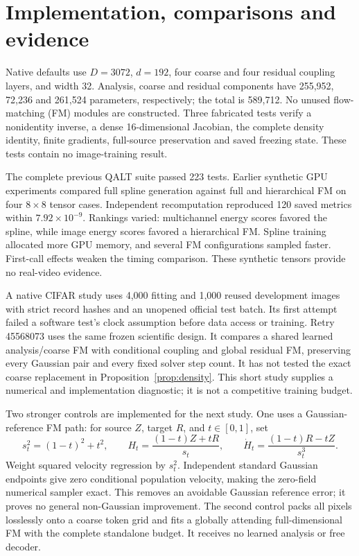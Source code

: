 \documentclass[11pt]{article}
\begin{document}
\section{Implementation, comparisons and evidence}
Native defaults use $D=3072$, $d=192$, four coarse and four residual coupling layers, and width 32. Analysis, coarse and residual components have 255,952, 72,236 and 261,524 parameters, respectively; the total is 589,712. No unused flow-matching (FM) modules are constructed. Three fabricated tests verify a nonidentity inverse, a dense 16-dimensional Jacobian, the complete density identity, finite gradients, full-source preservation and saved freezing state. These tests contain no image-training result.

The complete previous QALT suite passed 223 tests. Earlier synthetic GPU experiments compared full spline generation against full and hierarchical FM on four $8\times8$ tensor cases. Independent recomputation reproduced 120 saved metrics within $7.92\times10^{-9}$. Rankings varied: multichannel energy scores favored the spline, while image energy scores favored a hierarchical FM. Spline training allocated more GPU memory, and several FM configurations sampled faster. First-call effects weaken the timing comparison. These synthetic tensors provide no real-video evidence.

A native CIFAR study uses 4,000 fitting and 1,000 reused development images with strict record hashes and an unopened official test batch. Its first attempt failed a software test's clock assumption before data access or training. Retry 45568073 uses the same frozen scientific design. It compares a shared learned analysis/coarse FM with conditional coupling and global residual FM, preserving every Gaussian pair and every fixed solver step count. It has not tested the exact coarse replacement in Proposition~\ref{prop:density}. This short study supplies a numerical and implementation diagnostic; it is not a competitive training budget.

Two stronger controls are implemented for the next study. One uses a Gaussian-reference FM path: for source $Z$, target $R$, and $t\in[0,1]$, set
\begin{equation}
 s_t^2=(1-t)^2+t^2,\qquad
 H_t=\frac{(1-t)Z+tR}{s_t},\qquad
 \dot H_t=\frac{(1-t)R-tZ}{s_t^3}.
\end{equation}
Weight squared velocity regression by $s_t^2$. Independent standard Gaussian endpoints give zero conditional population velocity, making the zero-field numerical sampler exact. This removes an avoidable Gaussian reference error; it proves no general non-Gaussian improvement. The second control packs all pixels losslessly onto a coarse token grid and fits a globally attending full-dimensional FM with the complete standalone budget. It receives no learned analysis or free decoder.
\end{document}

